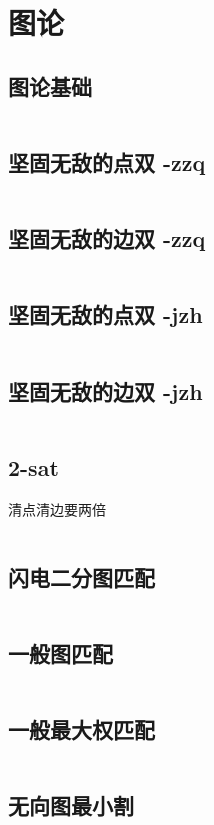 \chapter{图论}
\section{图论基础}
\inputminted{cpp}{\source/graph-theory/basic.cpp}
\section{坚固无敌的点双 -zzq}
\inputminted{cpp}{\source/graph-theory/Biconnected-Point-Component -zzq.cpp}
\section{坚固无敌的边双 -zzq}
\inputminted{cpp}{\source/graph-theory/Biconnected-Edge-Component -zzq.cpp}

\section{坚固无敌的点双 -jzh}
\inputminted{cpp}{\source/graph-theory/biconnected-graph-vertex -jzh.cpp}
\section{坚固无敌的边双 -jzh}
\inputminted{cpp}{\source/graph-theory/biconnected-graph-edge -jzh.cpp}
\section{2-sat}
清点清边要两倍\inputminted{cpp}{\source/graph-theory/two-satisfiability.cpp}
\section{闪电二分图匹配}
\inputminted{cpp}{\source/graph-theory/Hopcroft-Karp.cpp}
\section{一般图匹配}
\inputminted{cpp}{\source/graph-theory/general-matching.cpp}
\section{一般最大权匹配}
\inputminted{cpp}{\source/graph-theory/weighted_blossom.cpp}
\section{无向图最小割}
\inputminted{cpp}{\source/graph-theory/StoerWagner_O(V^3).cpp}
